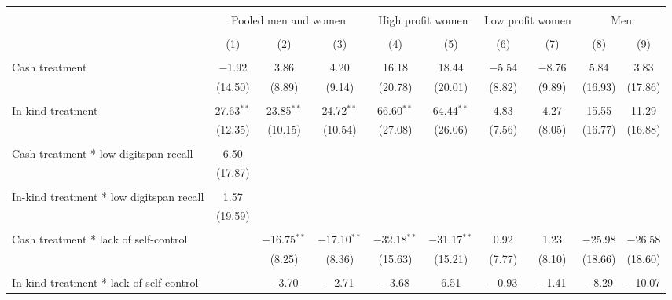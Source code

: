 
\begin{table}[!htbp] \centering 
  \caption{} 
  \label{} 
\begin{tabular}{@{\extracolsep{5pt}}lccccccccc} 
\\[-1.8ex]\hline 
\hline \\[-1.8ex] 
 & \multicolumn{3}{c}{Pooled men and women} & \multicolumn{2}{c}{High profit women} & \multicolumn{2}{c}{Low profit women} & \multicolumn{2}{c}{Men} \\ 
\\[-1.8ex] & (1) & (2) & (3) & (4) & (5) & (6) & (7) & (8) & (9)\\ 
\hline \\[-1.8ex] 
 Cash treatment & $-$1.92 & 3.86 & 4.20 & 16.18 & 18.44 & $-$5.54 & $-$8.76 & 5.84 & 3.83 \\ 
  & (14.50) & (8.89) & (9.14) & (20.78) & (20.01) & (8.82) & (9.89) & (16.93) & (17.86) \\ 
  & & & & & & & & & \\ 
 In-kind treatment & 27.63$^{**}$ & 23.85$^{**}$ & 24.72$^{**}$ & 66.60$^{**}$ & 64.44$^{**}$ & 4.83 & 4.27 & 15.55 & 11.29 \\ 
  & (12.35) & (10.15) & (10.54) & (27.08) & (26.06) & (7.56) & (8.05) & (16.77) & (16.88) \\ 
  & & & & & & & & & \\ 
 Cash treatment * low digitspan recall & 6.50 &  &  &  &  &  &  &  &  \\ 
  & (17.87) &  &  &  &  &  &  &  &  \\ 
  & & & & & & & & & \\ 
 In-kind treatment * low digitspan recall & 1.57 &  &  &  &  &  &  &  &  \\ 
  & (19.59) &  &  &  &  &  &  &  &  \\ 
  & & & & & & & & & \\ 
 Cash treatment * lack of self-control &  & $-$16.75$^{**}$ & $-$17.10$^{**}$ & $-$32.18$^{**}$ & $-$31.17$^{**}$ & 0.92 & 1.23 & $-$25.98 & $-$26.58 \\ 
  &  & (8.25) & (8.36) & (15.63) & (15.21) & (7.77) & (8.10) & (18.66) & (18.60) \\ 
  & & & & & & & & & \\ 
 In-kind treatment * lack of self-control &  & $-$3.70 & $-$2.71 & $-$3.68 & 6.51 & $-$0.93 & $-$1.41 & $-$8.29 & $-$10.07 \\ 

\end{tabular}
\end{table}

